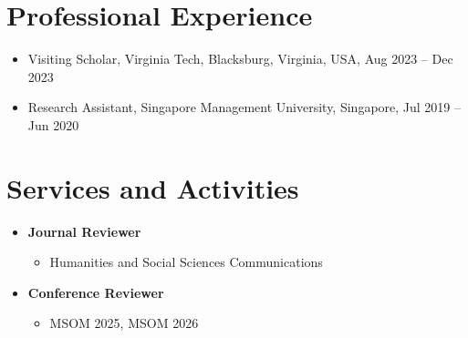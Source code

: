 \documentclass[12pt, a4paper]{article}
\begin{document}
{\begin{itemize}
\end{itemize}




\section*{Professional Experience}

\begin{itemize}[leftmargin=30pt]
    \item Visiting Scholar, Virginia Tech, Blacksburg, Virginia, USA, Aug 2023 -- Dec 2023	
    \item Research Assistant, Singapore Management University, Singapore, Jul 2019 -- Jun 2020
\end{itemize}




\section*{Services and Activities}

\begin{itemize}

	\item[] \textbf{Journal Reviewer}
	\begin{itemize}
		\item Humanities and Social Sciences Communications
	\end{itemize}

	\item[] \textbf{Conference Reviewer}
	\begin{itemize}
		\item MSOM 2025, MSOM 2026
	\end{itemize}


\end{itemize}}
\end{document}
